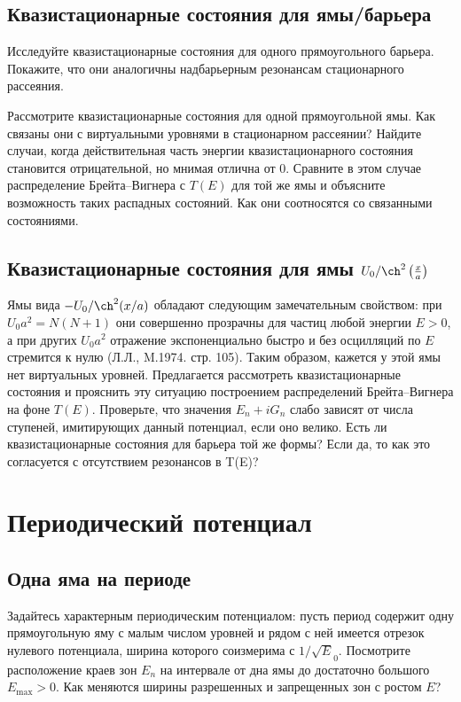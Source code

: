\documentclass[12pt]{article}
\begin{document}
\hypertarget{quasistacionary_state_well}
{}\subsection{Квазистационарные
состояния для ямы/барьера}
Исследуйте квазистационарные состояния для одного прямоугольного
барьера. Покажите, что они аналогичны надбарьерным резонансам
стационарного рассеяния.

Рассмотрите квазистационарные состояния для одной прямоугольной
ямы. Как связаны они с виртуальными уровнями в стационарном
рассеянии? Найдите случаи, когда действительная часть энергии
квазистационарного состояния становится отрицательной, но мнимая
отлична от 0. Сравните в этом случае распределение Брейта--Вигнера
с $T(E)$ для той же ямы и объясните возможность таких распадных
состояний. Как они соотносятся со связанными состояниями.

\hypertarget{quasistacionary_state_LL}
{}\subsection[Квазистационарные состояния для ``безотражательной''
ямы]{Квазистационарные состояния для ямы $U_0/\ch^2\left(\frac
xa\right)$}
Ямы вида $-U_0/\ch^2(x/a)$ обладают следующим замечательным свойством:
при $U_0a^2=N(N+1)$ они совершенно прозрачны для частиц любой энергии
$E>0$, а при других $U_0a^2$ отражение  экспоненциально быстро и без
осцилляций по $E$ стремится к нулю (Л.Л., M.1974. стр. 105). Таким образом,
кажется у этой
ямы нет виртуальных уровней. Предлагается рассмотреть
квазистационарные состояния и прояснить эту ситуацию
построением распределений Брейта--Вигнера на фоне $T(E)$.
Проверьте, что  значения $E_n+iG_n$ слабо зависят от
числа ступеней, имитирующих  данный потенциал, если оно велико.
Есть ли квазистационарные состояния для барьера той же формы?
Если да, то как это согласуется с отсутствием резонансов в T(E)?

\hypertarget{Periodical_potentials}{}\section{Периодический
потенциал}

\hypertarget{Periodical_1well}{}\subsection{Одна яма на периоде}
Задайтесь характерным периодическим потенциалом: пусть период
содержит одну прямоугольную яму с малым числом уровней и рядом с
ней имеется отрезок нулевого потенциала, ширина  которого
соизмерима с $1/\sqrt E_0$. Посмотрите расположение краев зон
$E_n$ на интервале от дна  ямы до достаточно большого
$E_{\max}>0$. Как меняются  ширины разрешенных и запрещенных  зон
с ростом $E$?
\end{document}

